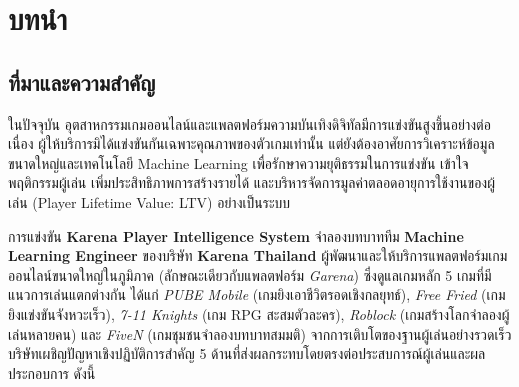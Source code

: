 \documentclass[11pt,a4paper]{article}
\newcommand{\thaiFrontPage}{%
    \ifcase\value{page}\or ก\or ข\or ค\or ง\or จ\or ฉ\or ช\or ซ\else\arabic{page}\fi%
}
\renewcommand{\contentsname}{สารบัญ}
\begin{document}
\restoregeometry

\clearpage
{}
\renewcommand{\thepage}{\thaiFrontPage}
\renewcommand{\contentsname}{สารบัญ}
\tableofcontents

\clearpage
{}
\renewcommand{\thepage}{\arabic{page}}
\raggedright
\setlength{\parindent}{1.0cm}

\section{บทนำ}

\subsection{ที่มาและความสำคัญ}

ในปัจจุบัน อุตสาหกรรมเกมออนไลน์และแพลตฟอร์มความบันเทิงดิจิทัลมีการแข่งขันสูงขึ้นอย่างต่อเนื่อง ผู้ให้บริการมิได้แข่งขันกันเฉพาะคุณภาพของตัวเกมเท่านั้น แต่ยังต้องอาศัยการวิเคราะห์ข้อมูลขนาดใหญ่และเทคโนโลยี Machine Learning เพื่อรักษาความยุติธรรมในการแข่งขัน เข้าใจพฤติกรรมผู้เล่น เพิ่มประสิทธิภาพการสร้างรายได้ และบริหารจัดการมูลค่าตลอดอายุการใช้งานของผู้เล่น (Player Lifetime Value: LTV) อย่างเป็นระบบ

การแข่งขัน \textbf{Karena Player Intelligence System} จำลองบทบาททีม \textbf{Machine Learning Engineer} ของบริษัท \textbf{Karena Thailand} ผู้พัฒนาและให้บริการแพลตฟอร์มเกมออนไลน์ขนาดใหญ่ในภูมิภาค (ลักษณะเดียวกับแพลตฟอร์ม \textit{Garena}) ซึ่งดูแลเกมหลัก 5 เกมที่มีแนวการเล่นแตกต่างกัน ได้แก่ \textit{PUBE Mobile} (เกมยิงเอาชีวิตรอดเชิงกลยุทธ์), \textit{Free Fried} (เกมยิงแข่งขันจังหวะเร็ว), \textit{7-11 Knights} (เกม RPG สะสมตัวละคร), \textit{Roblock} (เกมสร้างโลกจำลองผู้เล่นหลายคน) และ \textit{FiveN} (เกมชุมชนจำลองบทบาทสมมติ) จากการเติบโตของฐานผู้เล่นอย่างรวดเร็ว บริษัทเผชิญปัญหาเชิงปฏิบัติการสำคัญ 5 ด้านที่ส่งผลกระทบโดยตรงต่อประสบการณ์ผู้เล่นและผลประกอบการ ดังนี้
\end{document}
